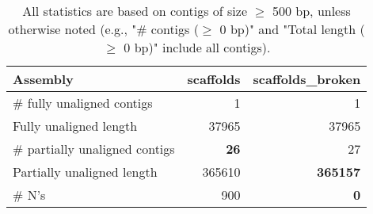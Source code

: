 \documentclass[12pt,a4paper]{article}
\begin{document}
\begin{table}[ht]
\begin{center}
\caption{All statistics are based on contigs of size $\geq$ 500 bp, unless otherwise noted (e.g., "\# contigs ($\geq$ 0 bp)" and "Total length ($\geq$ 0 bp)" include all contigs).}
\begin{tabular}{|l*{2}{|r}|}
\hline
Assembly & scaffolds & scaffolds\_broken \\ \hline
\# fully unaligned contigs & 1 & 1 \\ \hline
Fully unaligned length & 37965 & 37965 \\ \hline
\# partially unaligned contigs & {\bf 26} & 27 \\ \hline
Partially unaligned length & 365610 & {\bf 365157} \\ \hline
\# N's & 900 & {\bf 0} \\ \hline
\end{tabular}
\end{center}
\end{table}
\end{document}
